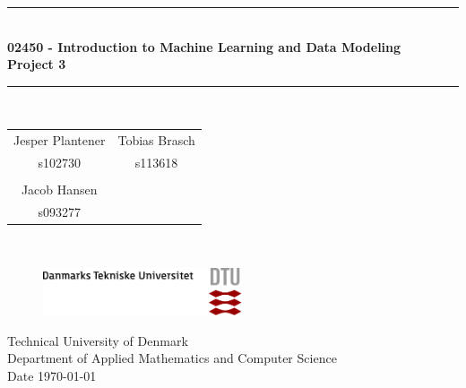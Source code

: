 \begin{titlepage}
\centering \parindent=0pt
\newcommand{\HRule}{\rule{\textwidth}{1mm}}
 \HRule\\[1cm]\Huge\bfseries
02450 - Introduction to Machine Learning and Data Modeling \\ [0.4cm] \Large Project 3\\ [0.7cm]
\HRule\\[2cm]
\large


\begin{tabular}{cc}
Jesper Plantener \qquad &  \qquad Tobias Brasch \\
s102730 & \qquad s113618 \\
\\
Jacob Hansen \\
s093277 \\
\end{tabular}\\[2cm]
 \normalsize

\begin{figure}[!h]
\raggedleft
\includegraphics[height=40pt]{pictures/DTU-logo-farve.png}
\end{figure}

\begin{flushleft}
Technical University of Denmark\\
Department of Applied Mathematics and Computer Science\\
Date \today \end{flushleft}
\end{titlepage}

